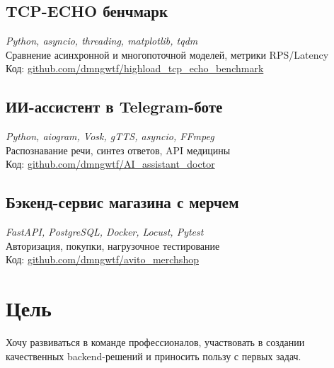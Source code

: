 \documentclass[a4paper,11pt]{article}
\begin{document}
	\subsection*{TCP-ECHO бенчмарк}
	\textit{Python, asyncio, threading, matplotlib, tqdm}\\
	Сравнение асинхронной и многопоточной моделей, метрики RPS/Latency\\
	Код: \href{https://github.com/dmngwtf/highload_tcp_echo_server_benchmark}{github.com/dmngwtf/highload\_tcp\_echo\_benchmark}
	
	\subsection*{ИИ-ассистент в Telegram-боте}
	\textit{Python, aiogram, Vosk, gTTS, asyncio, FFmpeg}\\
	Распознавание речи, синтез ответов, API медицины\\
	Код: \href{https://github.com/dmngwtf/AI_assistant_doctor}{github.com/dmngwtf/AI\_assistant\_doctor}
	
	\subsection*{Бэкенд-сервис магазина с мерчем}
	\textit{FastAPI, PostgreSQL, Docker, Locust, Pytest}\\
	Авторизация, покупки, нагрузочное тестирование\\
	Код: \href{https://github.com/dmngwtf/avito_merchshop}{github.com/dmngwtf/avito\_merchshop}
	
	\section*{Цель}
	Хочу развиваться в команде профессионалов, участвовать в создании качественных backend-решений и приносить пользу с первых задач.
	
\end{document}
